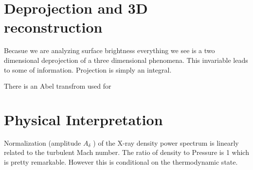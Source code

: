 \section{Deprojection and 3D reconstruction}\label{Chap:assumptionsParametric}

Becasue we are analyzing surface brightness everything we see is a two dimensional deprojection of a three dimensional phenomena. This invariable leads to some of information. Projection is simply an integral.

There is an Abel transfrom used for 

\section{Physical Interpretation}\label{Chap:assumptionsFromFluctsToTurb}




Normalization (amplitude $A_{\delta}$ ) of the X-ray density power spectrum is linearly related to the turbulent Mach number. The ratio of density to Pressure is 1 which is pretty remarkable. However this is conditional on the thermodynamic state. 

